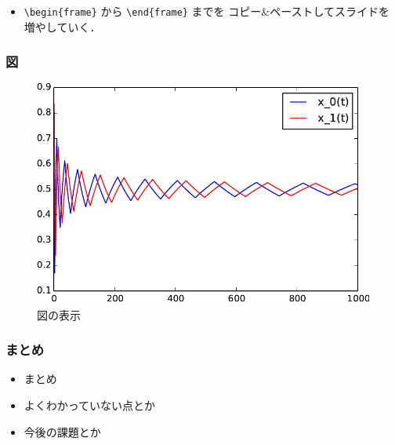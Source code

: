 \documentclass[dvipdfmx,fleqn]{beamer}
\begin{document}
\begin{frame}[containsverbatim]
\begin{itemize}
\item
\verb|\begin{frame}| から \verb|\end{frame}| までを
コピー\&ペーストしてスライドを増やしていく．
\end{itemize}
\end{frame}



\begin{frame}
\frametitle{図}
\begin{figure}
 \centering
 \includegraphics{oneplay2.pdf}
 \caption{図の表示}
 \label{fig:matchingpennies_plot}
\end{figure}
\end{frame}



\begin{frame}
\frametitle{まとめ}
\begin{itemize}\setlength{\parskip}{0.5em}
\item
まとめ

\item
よくわかっていない点とか

\item
今後の課題とか
\end{itemize}
\end{frame}
\end{document}
